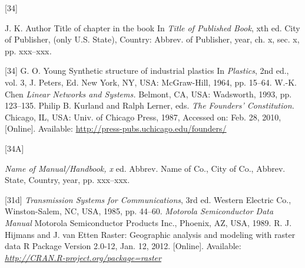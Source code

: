 \documentclass[letter]{IEEEtaes}
\begin{document}
\vspace*{-12pt}
\begin{thebibliography}{[34]}
\item[] J. K. Author
\newblock Title of chapter in the book
\newblock In \emph{Title of Published Book}, xth ed. City of Publisher, (only U.S. State), Country: Abbrev. of Publisher, year, ch. x, sec. {x}, pp. xxx--xxx\emph{.}
\end{thebibliography}


\vspace*{-12pt}
\begin{thebibliography}{[34]}
\setcounter{enumiv}{6}
G. O. Young
\newblock Synthetic structure of industrial plastics
\newblock In \emph{Plastics}, 2nd ed., vol. 3, J. Peters, Ed. New York, NY, USA: McGraw-Hill, 1964, pp. 15--64.
W.-K. Chen
\newblock \emph{Linear Networks and Systems.} Belmont, CA, USA: Wadsworth, 1993, pp. 123--135.
Philip B. Kurland and Ralph Lerner, eds.
\newblock \emph{The Founders' Constitution.} Chicago, IL, USA: Univ. of Chicago Press, 1987, Accessed on: Feb. 28, 2010, {[}Online{]}. Available: \href{http://press-pubs.uchicago.edu/founders/}{http://press-pubs.uchicago.edu/founders/}
\end{thebibliography}

\vspace*{-12pt}
\begin{thebibliography}{[34A]}
\item[]  \emph{Name of Manual/Handbook, x} ed.
\newblock Abbrev. Name of Co., City of Co., Abbrev. State, Country, year, pp. xxx--xxx.
\end{thebibliography}

\vspace*{-12pt}
\begin{thebibliography}{[31d]}
\setcounter{enumiv}{9}
\emph{Transmission Systems for Communications}, 3rd ed.
\newblock Western Electric Co., Winston-Salem, NC, USA, 1985, pp. 44--60.
\emph{Motorola Semiconductor Data Manual}
\newblock Motorola Semiconductor Products Inc., Phoenix, AZ, USA, 1989.
R. J. Hijmans and J. van Etten
\newblock Raster: Geographic analysis and modeling with raster data
\newblock R Package Version 2.0-12, Jan. 12, 2012. {[}Online{]}. Available: \emph{\href{http://CRAN.R-project.org/package=raster}{http://CRAN.R-project.org/package=raster}}
\end{thebibliography}
\end{document}
